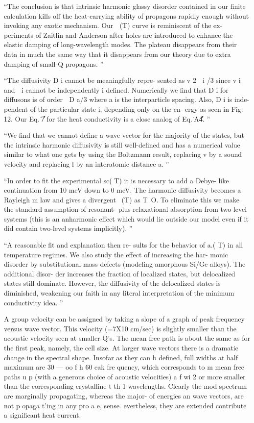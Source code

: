 \documentclass[aps,prb,preprint,superscriptaddress,amsmath,amssymb,floatfix]{revtex4}
\begin{document}
``The conclusion is that intrinsic harmonic glassy disorder
contained in our finite calculation kills off the heat-carrying
ability of propagons rapidly enough without invoking any
exotic mechanism. Our ␬ (T) curve is reminiscent of the ex-
periments of Zaitlin and Anderson after holes are introduced
to enhance the elastic damping of long-wavelength modes.
The plateau disappears from their data in much the same way
that it disappears from our theory due to extra damping of
small-Q propagons.
''

``The diffusivity D i cannot be meaningfully repre-
sented as v 2 ␶ i /3 since v i and ␶ i cannot be independently
i
defined. Numerically we find that D i for diffusons is of order
␻ D a/3 where a is the interparticle spacing. Also, D i is inde-
pendent of the particular state i, depending only on the en-
ergy as seen in Fig. 12. Our Eq. ͑7͒ for the heat conductivity
is a close analog of Eq. ͑A4͒.
''

``We find that we cannot define a wave vector for the
majority of the states, but the intrinsic harmonic diffusivity is still well-defined and has a numerical value
similar to what one gets by using the Boltzmann result, replacing v by a sound velocity and replacing l by
an interatomic distance a.
''\cite{feldman_thermal_1993}

``In order to fit the experimental sc( T) it is necessary to add a Debye-
like continuation from 10 meV down to 0 meV. The harmonic diffusivity becomes a Rayleigh m
law
and gives a divergent ~(T) as T~O. To eliminate this we make the standard assumption of resonant-
plus-relaxational absorption from two-level systems (this is an anharmonic effect which would lie outside
our model even if it did contain two-level systems implicitly).
''\cite{feldman_thermal_1993}

``A reasonable fit and explanation then re-
sults for the behavior of a.( T) in all temperature regimes. We also study the effect of increasing the har-
monic disorder by substitutional mass defects (modeling amorphous Si/Ge alloys). The additional disor-
der increases the fraction of localized states, but delocalized states still dominate. However, the
diffusivity of the delocalized states is diminished, weakening our faith in any literal interpretation of the
minimum conductivity idea.
'' \cite{feldman_thermal_1993}


A group velocity can be assigned by taking
a slope of a graph of peak frequency versus wave vector.
This velocity (=7X10 cm/sec) is slightly smaller than
the acoustic velocity seen at smaller Q's. The mean free
path is about the same as for the first peak, namely, the
cell size. At larger wave vectors there is a dramatic
change in the spectral shape. Insofar as they can b
defined, full widths at half maximum are 30 —
oo f h
60%
eak fre quency, which corresponds to m
mean free paths
u
p
(with a generous choice of acoustic velocities) a f
wi
2 or more smaller than the corresponding crystalline
t th 1
wavelengths.
Clearly the mod
spectrum are marginally propagating, whereas the major-
of energies an wave vectors, are not p opaga t'ing in any
pro a
e,
sense.
evertheless, they are extended
contribute a significant heat current.
\cite{feldman_thermal_1993}
\end{document}
